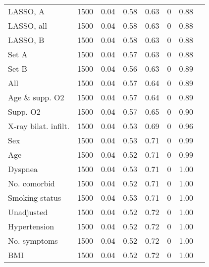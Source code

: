 \documentclass{article}
\begin{document}
{\begin{longtable}{lccccccc}
LASSO, A & 1500 & 0.04 & 0.58 & 0.63 & 0 & 0.88\\
LASSO, all & 1500 & 0.04 & 0.58 & 0.63 & 0 & 0.88\\
LASSO, B & 1500 & 0.04 & 0.58 & 0.63 & 0 & 0.88\\
Set A & 1500 & 0.04 & 0.57 & 0.63 & 0 & 0.88\\
Set B & 1500 & 0.04 & 0.56 & 0.63 & 0 & 0.89\\
All & 1500 & 0.04 & 0.57 & 0.64 & 0 & 0.89\\
Age \& supp. O2 & 1500 & 0.04 & 0.57 & 0.64 & 0 & 0.89\\
Supp. O2 & 1500 & 0.04 & 0.57 & 0.65 & 0 & 0.90\\
X-ray bilat. infilt. & 1500 & 0.04 & 0.53 & 0.69 & 0 & 0.96\\
Sex & 1500 & 0.04 & 0.53 & 0.71 & 0 & 0.99\\
Age & 1500 & 0.04 & 0.52 & 0.71 & 0 & 0.99\\
Dyspnea & 1500 & 0.04 & 0.53 & 0.71 & 0 & 1.00\\
No. comorbid & 1500 & 0.04 & 0.52 & 0.71 & 0 & 1.00\\
Smoking status & 1500 & 0.04 & 0.53 & 0.71 & 0 & 1.00\\
Unadjusted & 1500 & 0.04 & 0.52 & 0.72 & 0 & 1.00\\
Hypertension & 1500 & 0.04 & 0.52 & 0.72 & 0 & 1.00\\
No. symptoms & 1500 & 0.04 & 0.52 & 0.72 & 0 & 1.00\\
BMI & 1500 & 0.04 & 0.52 & 0.72 & 0 & 1.00\\
\bottomrule
\hline
\end{longtable}
}

\clearpage
\end{document}
